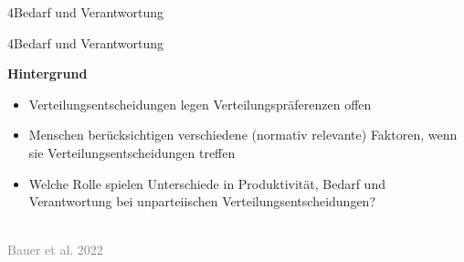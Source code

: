 \documentclass[xcolor=table,9pt,aspectratio=169]{beamer}
\begin{document}
\begin{frame}
\begin{overlayarea}{\textwidth}{0.81\paperheight}{
   \vspace*{11mm}
   \textcolor{uolblue}
   {4\hspace*{1em}Bedarf und Verantwortung}
}
\end{overlayarea}
\end{frame}


\begin{frame}{\vspace*{10mm}4\hspace*{1em}Bedarf und Verantwortung}
\begin{multicols}{2}
   \textbf{Hintergrund}\\
   \medskip
   \begin{itemize}
      \item Verteilungsentscheidungen legen Verteilungspräferenzen offen
      \item Menschen berücksichtigen verschiedene (normativ relevante) Faktoren, wenn sie Verteilungsentscheidungen treffen
      \item Welche Rolle spielen Unterschiede in Produktivität, Bedarf und Verantwortung bei unparteiischen Verteilungsentscheidungen?
   \end{itemize}
   \vfill
   \begin{center}
      \\
      \textcolor{gray}{Bauer et al. 2022}
   \end{center}
\end{multicols}
\end{frame}
\end{document}
